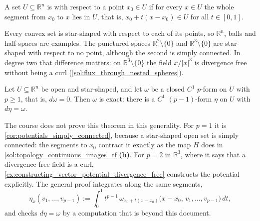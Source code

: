 \begin{definition}
\label{def:star_shaped}
A set $U \subseteq \mathbb{R}^n$ is   with respect to
a point $x_0 \in U$ if for every $x \in U$ the whole segment from $x_0$ to $x$ lies in $U$, that
is, $x_0 + t(x-x_0) \in U$ for all $t \in [0,1]$.
\end{definition}

Every convex set is star-shaped with respect to each of its points, so $\mathbb{R}^n$, balls and
half-spaces are examples. The punctured spaces $\mathbb{R}^2\setminus\{0\}$ and
$\mathbb{R}^3\setminus\{0\}$ are star-shaped with respect to no point, although the second is
simply connected. In degree two that difference matters: on $\mathbb{R}^3\setminus\{0\}$ the
field $x/\lvert x\rvert^3$ is divergence free without being a curl
(\cref{sol:flux_through_nested_spheres}).

\begin{theorem}
\label{thm:poincare_lemma_star_shaped}
Let $U \subseteq \mathbb{R}^n$ be open and star-shaped, and let $\omega$ be a closed $C^1$
$p$-form on $U$ with $p \geq 1$, that is, $d\omega = 0$. Then $\omega$ is exact: there is a $C^1$
$(p-1)$-form $\eta$ on $U$ with $d\eta = \omega$.
\end{theorem}

\begin{ainote}
The course does not prove this theorem in this generality. For $p = 1$ it is
\cref{cor:potentials_simply_connected}, because a star-shaped open set is simply connected: the
segments to $x_0$ contract it exactly as the map $H$ does in
\cref{sol:topology_continuous_images_tf}\textbf{(b)}. For $p = 2$ in $\mathbb{R}^3$, where it
says that a divergence-free field is a curl,
\cref{ex:constructing_vector_potential_divergence_free} constructs the potential explicitly. The
general proof integrates along the same segments,
\[\eta_x(v_1,\dots,v_{p-1}) := \int_0^1 t^{p-1}\,
  \omega_{x_0+t(x-x_0)}\big(x-x_0,\,v_1,\dots,v_{p-1}\big)\,dt,\]
and checks $d\eta = \omega$ by a computation that is beyond this document.
\end{ainote}

